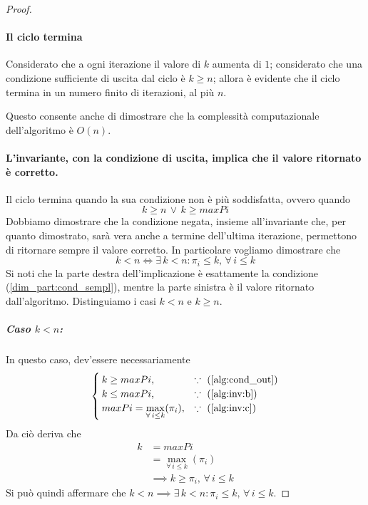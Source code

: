 \documentclass{article}
\begin{document}
\begin{proof}
\begin{itemize}
    \end{itemize}

    \paragraph{Il ciclo termina}
    Considerato che a ogni iterazione il valore di $k$ aumenta di $1$;
    considerato che una condizione sufficiente di uscita dal ciclo è $k \geq n$;
    allora è evidente che il ciclo termina in un numero finito di iterazioni, al più $n$.
    
    Questo consente anche di dimostrare che la complessità computazionale dell'algoritmo è $O(n)$.

    \paragraph{L'invariante, con la condizione di uscita, implica che il valore ritornato è corretto.}
    Il ciclo termina quando la sua condizione non è più soddisfatta, ovvero quando
    \begin{equation}\label{alg:cond_out}
        k \geq n\, \vee\, k \geq maxPi
    \end{equation}
    Dobbiamo dimostrare che la condizione negata, insieme all'invariante che, per quanto dimostrato, sarà vera anche a termine dell'ultima iterazione, permettono di ritornare sempre il valore corretto.
    In particolare vogliamo dimostrare che
    \[ k < n \iff \exists\, k < n : \pi_i \leq k,\, \forall\, i \leq k \]
    Si noti che la parte destra dell'implicazione è esattamente la condizione (\ref{dim_part:cond_sempl}), mentre la parte sinistra è il valore ritornato dall'algoritmo.
    Distinguiamo i casi $k < n$ e $k \geq n$.

    \subparagraph{Caso $k < n$:}
    In questo caso, dev'essere necessariamente
    \begin{equation*}
        \begin{cases}
            k \geq maxPi \mbox{,}                                        & \because \mbox{ (\ref{alg:cond_out})} \\
            k \leq maxPi \mbox{,}                                        & \because \mbox{ (\ref{alg:inv:b})}    \\
            maxPi = \displaystyle\max_{\forall\, i \leq k}(\pi_i) \mbox{,} & \because \mbox{ (\ref{alg:inv:c})}
        \end{cases}
    \end{equation*}
    Da ciò deriva che
    \begin{align*}
        k & = maxPi                                \\
          & = \max_{\forall\, i \leq k}(\pi_i)       \\
          & \implies k \geq \pi_i,\, \forall\, i \leq k
    \end{align*}
    Si può quindi affermare che $k < n \implies \exists\, k < n : \pi_i \leq k,\, \forall\, i \leq k$.


\end{proof}
\end{document}
